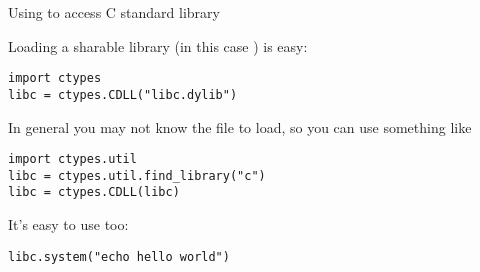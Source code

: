 \documentclass[10pt, t]{beamer}
\let\texttt=\graytt
\let\alert=\textbf
\begin{document}
\begin{frame}[fragile,label=sec-3-2]{Using \texttt{ctypes} to access C standard library}

Loading a sharable library (in this case \texttt{libc}) is easy:
\lstset{language=Python,label= ,caption= ,numbers=none}
\begin{lstlisting}
import ctypes
libc = ctypes.CDLL("libc.dylib")
\end{lstlisting}

\pause
In general you may not know the file to load, so you can use something like
\lstset{language=Python,label= ,caption= ,numbers=none}
\begin{lstlisting}
import ctypes.util
libc = ctypes.util.find_library("c")
libc = ctypes.CDLL(libc)
\end{lstlisting}

\pause
It's easy to use too:
\lstset{language=Python,label= ,caption= ,numbers=none}
\begin{lstlisting}
libc.system("echo hello world")
\end{lstlisting}
\end{frame}



\end{document}
